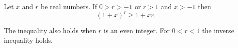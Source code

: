 \documentclass{article}
\begin{document}
Let $x$ and $r$ be real numbers.
If\; $0>r>-1$ or $r>1$ and $x>-1$ then
$$(1+x)^r\ge 1+xr.$$
\smallskip

The inequality also holds when $r$ is an even integer.
For $0<r<1$ the inverse inequality holds.
\end{document}
